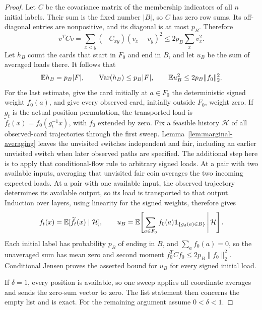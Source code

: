 \begin{proof}
Let $C$ be the covariance matrix of the membership indicators of all $n$
initial labels. Their sum is the fixed number $|B|$, so $C$ has zero row
sums. Its off-diagonal entries are nonpositive, and its diagonal is at
most $p_B$. Therefore
\[
 v^TCv=\sum_{x<y}(-C_{xy})(v_x-v_y)^2
 \le2p_B\sum_xv_x^2.
\]
Let $h_B$ count the cards that start in $F_0$ and end in $B$, and let
$u_B$ be the sum of averaged loads there. It follows that
\begin{equation}\label{cycles:negative-moments}
 \mathbb E h_B=p_B|F|,\qquad
 \operatorname{Var}(h_B)\le p_B|F|,\qquad
 \mathbb E u_B^2\le2p_B\|f_0\|_2^2.
\end{equation}
For the last estimate, give the card initially at $a\in F_0$ the
deterministic signed weight $f_0(a)$, and give every observed card,
initially outside $F_0$, weight zero. If $g_t$ is the actual position
permutation, the transported load is
$\widetilde f_t(x)=f_0(g_t^{-1}x)$, with $f_0$ extended by zero.
Fix a feasible history $\mathcal H$ of all observed-card trajectories
through the first sweep. Lemma~\ref{lem:marginal-averaging} leaves the
unvisited switches independent and fair, including an earlier unvisited
switch when later observed paths are specified. The additional step here
is to apply that conditional-flow rule to arbitrary signed loads.
At a pair with two available inputs, averaging that unvisited fair coin
averages the two incoming expected loads. At a pair with one available input,
the observed trajectory determines its available output, so its load is
transported to that output. Induction over layers, using linearity for
the signed weights, therefore gives
\begin{equation}\label{cycles:signed-load-jensen}
 f_t(x)=\mathbb E[\widetilde f_t(x)\mid\mathcal H],\qquad
 u_B=\mathbb E\!\left[\sum_{a\in F_0}f_0(a)
                    \mathbf1_{\{g_d(a)\in B\}}\,
                    \middle|\,\mathcal H\right].
\end{equation}
Each initial label has probability $p_B$ of ending in $B$, and
$\sum_a f_0(a)=0$, so the unaveraged sum has mean zero and second moment
$f_0^TCf_0\le2p_B\|f_0\|_2^2$. Conditional Jensen proves the asserted
bound for $u_B$ for every signed initial load.

If $\delta=1$, every position is available, so one sweep applies all
coordinate averages and sends the zero-sum vector to zero. The list
statement then concerns the empty list and is exact. For the remaining
argument assume $0<\delta<1$.


\end{proof}
